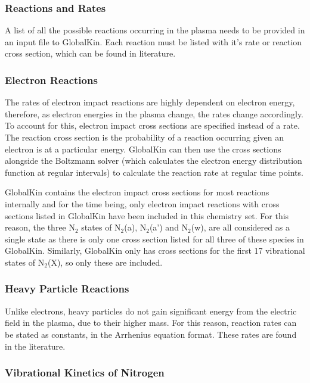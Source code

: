 \documentclass[11pt, oneside]{article}   	%
\begin{document}
\subsubsection{Reactions and Rates}

A list of all the possible reactions occurring in the plasma needs to be provided in an input file to GlobalKin.
Each reaction must be listed with it's rate or reaction cross section, which can be found in literature.

\subsubsection*{Electron Reactions}
The rates of electron impact reactions are highly dependent on electron energy, therefore, as electron energies in the plasma change, the rates change accordingly.
To account for this, electron impact cross sections are specified instead of a rate.
The reaction cross section is the probability of a reaction occurring given an electron is at a particular energy.
GlobalKin can then use the cross sections alongside the Boltzmann solver (which calculates the electron energy distribution function at regular intervals) to calculate the reaction rate at regular time points.

GlobalKin contains the electron impact cross sections for most reactions internally and for the time being, only electron impact reactions with cross sections listed in GlobalKin have been included in this chemistry set.
For this reason, the three N$_2$ states of N$_2$(a), N$_2$(a') and N$_2$(w), are all considered as a single state as there is only one cross section listed for all three of these species in GlobalKin.
Similarly, GlobalKin only has cross sections for the first 17 vibrational states of N$_2$(X), so only these are included.

\subsubsection*{Heavy Particle Reactions}
Unlike electrons, heavy particles do not gain significant energy from the electric field in the plasma, due to their higher mass.
For this reason, reaction rates can be stated as constants, in the Arrhenius equation format.
These rates are found in the literature.


\subsubsection*{Vibrational Kinetics of Nitrogen}
\end{document}
